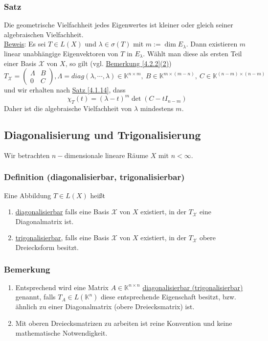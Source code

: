 \subsubsection{Satz}
\label{4.3.7}
Die geometrische Vielfachheit jedes Eigenwertes ist kleiner oder gleich seiner algebraischen Vielfachheit.\\
\underline{Beweis}: Es sei $T\in L(X)$ und $\lambda \in \sigma (T)$ mit $m:=\dim E_\lambda$.  Dann existieren $m$ linear unabhängige Eigenvektoren von $T$ in $E_\lambda$.  Wählt man diese als ersten Teil einer Basis $\mathcal{X}$ von $X$, so gilt (vgl. \hyperref[4.2.2]{Bemerkung \ref{4.2.2}(2)})
\[T_\mathcal{X} =\begin{pmatrix}\Lambda & B\\ 0 & C\end{pmatrix}, \Lambda=diag(\lambda ,\cdots ,\lambda )\in\mathbb{K}^{n\times m},\ B\in\mathbb{K}^{m\times (m-n)},\ C\in\mathbb{K}^{(n-m)\times (n-m)}\]
und wir erhalten nach \hyperref[4.1.14]{Satz \ref{4.1.14}}, dass
\[\chi _T(t)=(\lambda -t)^m \det (C-tI_{n-m})\]
Daher ist die algebraische Vielfachheit von $\lambda$ mindestens $m$.
\subsection{Diagonalisierung und Trigonalisierung}
Wir betrachten $n-$dimensionale lineare Räume $X$ mit $n<\infty$.
\subsubsection{Definition (diagonalisierbar, trigonalisierbar)}
Eine Abbildung $T\in L(X)$ heißt
\renewcommand{\labelenumi}{(\alph{enumi})}
\begin{enumerate}
\item \underline{diagonalisierbar} falls eine Basis $\mathcal{X}$ von $X$ existiert, in der $T_\mathcal{X}$ eine Diagonalmatrix ist.
\item \underline{trigonalisierbar}, falls eine Basis $\mathcal{X}$ von $X$ existiert, in der $T_\mathcal{X}$ obere Dreiecksform besitzt.
\end{enumerate}
\subsubsection{Bemerkung}
\renewcommand{\labelenumi}{(\arabic{enumi})}
\begin{enumerate}
\item Entsprechend wird eine Matrix $A\in \mathbb{K}^{n\times n}$ \underline{diagonalisierbar (trigonalisierbar)} genannt, falls $T_A\in L(\mathbb{K}^n)$ diese entsprechende Eigenschaft besitzt, bzw. ähnlich zu einer Diagonalmatrix (obere Dreiecksmatrix) ist.
\item Mit oberen Dreiecksmatrizen zu arbeiten ist reine Konvention und keine mathematische Notwendigkeit.
\end{enumerate}
